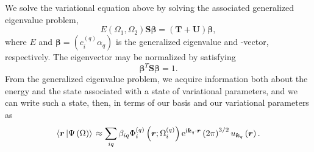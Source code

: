 We solve the variational equation above by solving the associated
generalized eigenvalue problem, 
\begin{equation}
  E\left(\Omega_{1},\Omega_{2}\right)
  \bm{S}\bm{\beta} = \left(\bm{T} + \bm{U}\right)\bm{\beta},
\end{equation}
where $E$ and $\bm{\beta} = \left(c_{i}^{(q)}\alpha_{q}\right)$ is the
generalized eigenvalue and -vector, respectively. The eigenvector may
be normalized by satisfying 
\begin{equation}
  \bm{\beta}^{T}\bm{S}\bm{\beta} = 1.
\end{equation}
From the generalized eigenvalue problem, we acquire information both
about the energy and the state associated with a state of variational
parameters, and we can write such a state, then, in terms of our basis
and our variational parameters as
\begin{equation}
  \textstyle \left\langle \bm{r} \left| \Psi\left(\Omega\right) \right\rangle\right. \displaystyle \approx
  \sum_{iq}
  \beta_{iq}
  \Phi_{i}^{(q)}\left(\bm{r};\Omega_{i}^{(q)}\right)
  \mathrm{e}^{\mathrm{i}\bm{k}_{q}\cdot\bm{r}}
  \left(2\pi\right)^{3/2}u_{\bm{k}_{q}}\left(\bm{r}\right).
\end{equation}

%
